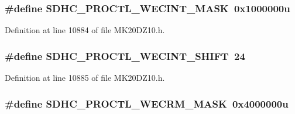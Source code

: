 \subsubsection[{\texorpdfstring{S\+D\+H\+C\+\_\+\+P\+R\+O\+C\+T\+L\+\_\+\+W\+E\+C\+I\+N\+T\+\_\+\+M\+A\+SK}{SDHC_PROCTL_WECINT_MASK}}]{\setlength{\rightskip}{0pt plus 5cm}\#define S\+D\+H\+C\+\_\+\+P\+R\+O\+C\+T\+L\+\_\+\+W\+E\+C\+I\+N\+T\+\_\+\+M\+A\+SK~0x1000000u}\hypertarget{group___s_d_h_c___register___masks_ga08649036ee7355491608a89004ab0628}{}\label{group___s_d_h_c___register___masks_ga08649036ee7355491608a89004ab0628}


Definition at line 10884 of file M\+K20\+D\+Z10.\+h.

\subsubsection[{\texorpdfstring{S\+D\+H\+C\+\_\+\+P\+R\+O\+C\+T\+L\+\_\+\+W\+E\+C\+I\+N\+T\+\_\+\+S\+H\+I\+FT}{SDHC_PROCTL_WECINT_SHIFT}}]{\setlength{\rightskip}{0pt plus 5cm}\#define S\+D\+H\+C\+\_\+\+P\+R\+O\+C\+T\+L\+\_\+\+W\+E\+C\+I\+N\+T\+\_\+\+S\+H\+I\+FT~24}\hypertarget{group___s_d_h_c___register___masks_ga575db16a4ed36389472243d329f5ec7c}{}\label{group___s_d_h_c___register___masks_ga575db16a4ed36389472243d329f5ec7c}


Definition at line 10885 of file M\+K20\+D\+Z10.\+h.

\subsubsection[{\texorpdfstring{S\+D\+H\+C\+\_\+\+P\+R\+O\+C\+T\+L\+\_\+\+W\+E\+C\+R\+M\+\_\+\+M\+A\+SK}{SDHC_PROCTL_WECRM_MASK}}]{\setlength{\rightskip}{0pt plus 5cm}\#define S\+D\+H\+C\+\_\+\+P\+R\+O\+C\+T\+L\+\_\+\+W\+E\+C\+R\+M\+\_\+\+M\+A\+SK~0x4000000u}\hypertarget{group___s_d_h_c___register___masks_ga296669c47b763f48caf28c35c1be2240}{}\label{group___s_d_h_c___register___masks_ga296669c47b763f48caf28c35c1be2240}


